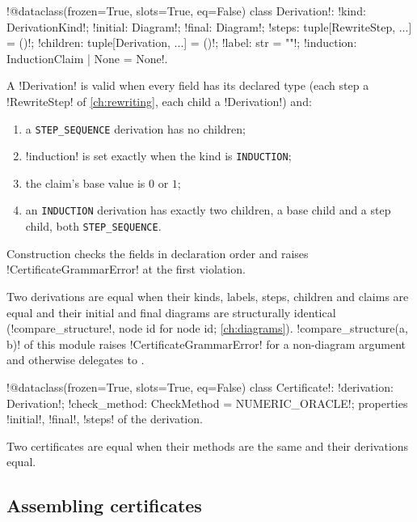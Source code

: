 \begin{signature}
\py!@dataclass(frozen=True, slots=True, eq=False) class Derivation!: \py!kind: DerivationKind!; \py!initial: Diagram!; \py!final: Diagram!; \py!steps: tuple[RewriteStep, ...] = ()!; \py!children: tuple[Derivation, ...] = ()!; \py!label: str = ""!; \py!induction: InductionClaim | None = None!.
\end{signature}

\begin{definition}\label{def:proofs-derivation}
A \py!Derivation! is valid when every field has its declared type (each step a \py!RewriteStep! of \cref{ch:rewriting}, each child a \py!Derivation!) and:
\begin{enumerate}
\item a \texttt{STEP\_SEQUENCE} derivation has no children;
\item \py!induction! is set exactly when the kind is \texttt{INDUCTION};
\item the claim's base value is $0$ or $1$;
\item an \texttt{INDUCTION} derivation has exactly two children, a base child and a step child, both \texttt{STEP\_SEQUENCE}.
\end{enumerate}
Construction checks the fields in declaration order and raises \py!CertificateGrammarError! at the first violation.
\end{definition}

Two derivations are equal when their kinds, labels, steps, children and claims are equal and their initial and final diagrams are structurally identical (\py!compare_structure!, node id for node id; \cref{ch:diagrams}). \py!compare_structure(a, b)! of this module raises \py!CertificateGrammarError! for a non-diagram argument and otherwise delegates to .

\begin{signature}
\py!@dataclass(frozen=True, slots=True, eq=False) class Certificate!: \py!derivation: Derivation!; \py!check_method: CheckMethod = NUMERIC_ORACLE!; properties \py!initial!, \py!final!, \py!steps! of the derivation.
\end{signature}
Two certificates are equal when their methods are the same and their derivations equal.

\subsection{Assembling certificates}

